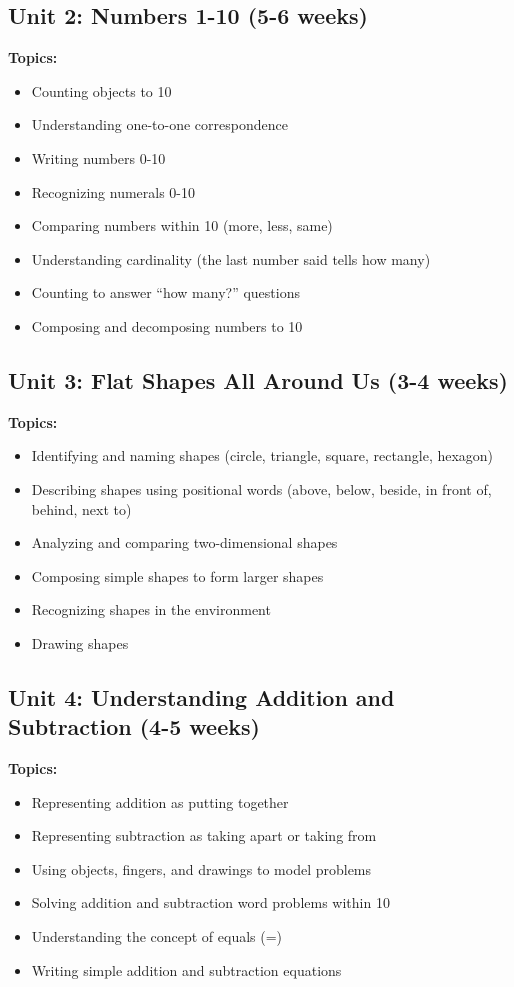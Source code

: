 \documentclass[11pt,letterpaper]{report}
\begin{document}
\subsection{Unit 2: Numbers 1-10 (5-6 weeks)}

\textbf{Topics:}
\begin{itemize}
    \item Counting objects to 10
    \item Understanding one-to-one correspondence
    \item Writing numbers 0-10
    \item Recognizing numerals 0-10
    \item Comparing numbers within 10 (more, less, same)
    \item Understanding cardinality (the last number said tells how many)
    \item Counting to answer ``how many?'' questions
    \item Composing and decomposing numbers to 10
\end{itemize}

\subsection{Unit 3: Flat Shapes All Around Us (3-4 weeks)}

\textbf{Topics:}
\begin{itemize}
    \item Identifying and naming shapes (circle, triangle, square, rectangle, hexagon)
    \item Describing shapes using positional words (above, below, beside, in front of, behind, next to)
    \item Analyzing and comparing two-dimensional shapes
    \item Composing simple shapes to form larger shapes
    \item Recognizing shapes in the environment
    \item Drawing shapes
\end{itemize}

\subsection{Unit 4: Understanding Addition and Subtraction (4-5 weeks)}

\textbf{Topics:}
\begin{itemize}
    \item Representing addition as putting together
    \item Representing subtraction as taking apart or taking from
    \item Using objects, fingers, and drawings to model problems
    \item Solving addition and subtraction word problems within 10
    \item Understanding the concept of equals (=)
    \item Writing simple addition and subtraction equations
\end{itemize}
\end{document}
